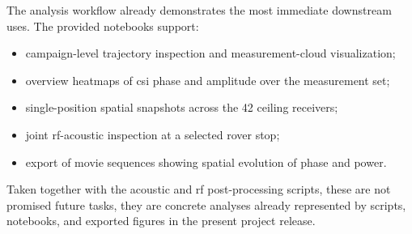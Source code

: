 The analysis workflow already demonstrates the most immediate downstream uses. The provided notebooks support:
\begin{itemize}
    \item campaign-level trajectory inspection and measurement-cloud visualization;
    \item overview heatmaps of \gls{csi} phase and amplitude over the measurement set;
    \item single-position spatial snapshots across the 42 ceiling receivers;
    \item joint \gls{rf}-acoustic inspection at a selected rover stop;
    \item export of movie sequences showing spatial evolution of phase and power.
\end{itemize}
Taken together with the acoustic and \gls{rf} post-processing scripts, these are not promised future tasks, they are concrete analyses already represented by scripts, notebooks, and exported figures in the present project release.




